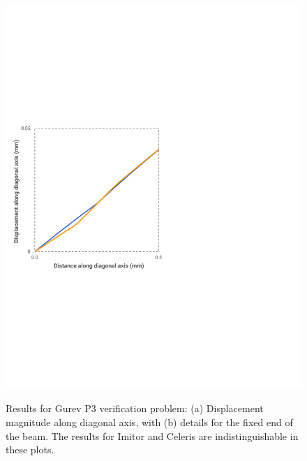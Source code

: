 \begin{figure}[ht!]
{		\includegraphics[scale=0.46]{media/5-verif/2-gurev3/gurev3-2.pdf}
\label{fig:gure3-2}}		
%
\caption{Results for Gurev P3 verification problem: (a) Displacement magnitude along diagonal axis, with (b) details for the fixed end of the beam. The results for Imitor and Celeris are indistinguishable in these plots.}
\label{fig:gurev3}
\end{figure}

